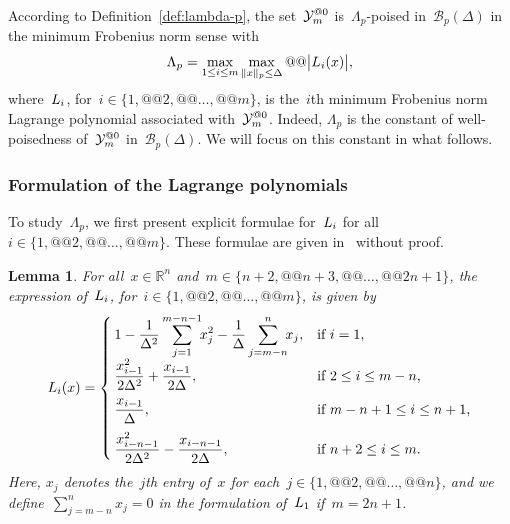 \documentclass{article}
\makeatletter
\newcounter{cite}
\theoremstyle{definition}
\theoremstyle{plain}
\newtheorem{lemma}{Lemma}[section]
\theoremstyle{remark}
\newcommand*{\abs}[2][]{#1\lvert#2#1\rvert}
\newcommand*{\norm}[2][]{#1\lVert#2#1\rVert}
\newcommand*{\set}[2][]{#1\{#2#1\}}
\newcommand*{\R}{\mathbb{R}}
\newcommand*{\lagp}[1][]{L\ifblank{#1}{}{_{#1}}}
\newcommand*{\xpt}[1][]{\mathcal{Y}\ifblank{#1}{}{^{@#1}}}
\makeatother
\begin{document}
According to Definition~\ref{def:lambda-p}, the set~$\xpt[0]_m$ is~$\Lambda_p$-poised in~$\mathcal{B}_p(\Delta)$ in the minimum Frobenius norm sense with
\begin{equation}
    \label{eq:Lambdap}
    \Lambda_p = \max_{1 \le i \le m} \max_{\norm{x}_p \le \Delta} @@ \abs[\big]{\lagp[i](x)},
\end{equation}
where~$\lagp[i]$, for~$i \in \set{1, @@ 2, @@ \dots, @@ m}$, is the~$i$th minimum Frobenius norm Lagrange polynomial associated with~$\xpt[0]_m$.
Indeed, $\Lambda_p$ is the {constant of well-poisedness} of~$\xpt[0]_m$ in~$\mathcal{B}_p(\Delta)$.
We will focus on this constant in what follows.

\subsubsection{Formulation of the Lagrange polynomials}

To study~$\Lambda_p$, we first present explicit formulae for~$\lagp[i]$ for all~$i \in \set{1, @@ 2, @@ \dots, @@ m}$.
These formulae are given in~\cite[\S~3]{Powell_2006} without proof.

\begin{lemma}
    \label{lem:lagp}
    For all~$x \in \R^n$ and~$m \in \set{n + 2, @@ n + 3, @@ \dots,  @@ 2n + 1}$, the expression of~$\lagp[i]$, for~$i \in \set{1, @@ 2, @@ \dots, @@ m}$, is given by
    \begin{equation}
        \label{eq:lagp}
        \lagp[i](x) =
        \begin{cases}
            \displaystyle 1 - \frac{1}{\Delta^2} \sum_{j = 1}^{m - n - 1} \!\! x_j^2 - \frac{1}{\Delta} \sum_{j = m - n}^n \!\! x_j,    & \text{if~$i = 1$,}\\[2ex]
            \displaystyle \frac{x_{i - 1}^2}{2\Delta^2} + \frac{x_{i - 1}}{2\Delta},                                                    & \text{if~$2 \le i \le m - n$,}\\[2ex]
            \displaystyle \frac{x_{i - 1}}{\Delta},                                                                          & \text{if~$m - n + 1 \le i \le n + 1$,}\\[2ex]
            \displaystyle \frac{x_{i - n - 1}^2}{2\Delta^2} - \frac{x_{i -n- 1}}{2\Delta},                                    & \text{if~$n+2\le i \le m$.}
        \end{cases}
    \end{equation}
    Here, $x_j$ denotes the~$j$th entry of~$x$ for each~$j \in \set{1, @@ 2, @@ \dots, @@ n}$, and we define~$\sum_{j = m - n}^n x_j = 0$ in the formulation of~$\lagp[1]$ if~$m = 2n + 1$.
\end{lemma}
\end{document}
